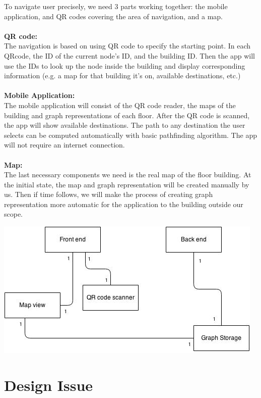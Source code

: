 \documentclass[12pt]{article}
\begin{document}
To navigate user precisely, we need 3 parts working together: the mobile application, and QR codes covering the area of navigation, and a map.
\\ \\
\textbf{QR code:}
\\
The navigation is based on using QR code to specify the starting point. In each QRcode, the ID of the current node’s ID, and the building ID. Then the app will use the IDs to look up the node inside the building and display corresponding information (e.g. a map for that building it’s on, available destinations, etc.)
\\ \\
\textbf{Mobile Application:}
\\
The mobile application will consist of the QR code reader, the maps of the building and graph representations of each floor. After the QR code is scanned, the app will show available destinations. The path to any destination the user selects can be computed automatically with basic pathfinding algorithm. The app will not require an internet connection. 
\\ \\
\textbf{Map:}
\\
The last necessary components we need is the real map of the floor building. At the initial state, the map and graph representation will be created manually by us. Then if time follows, we will make the process of creating graph representation more automatic for the application to the building outside our scope.


\begin{center}
\includegraphics[scale=0.8]{image/image04.jpg}
\end{center}



\section{Design Issue}
\end{document}
